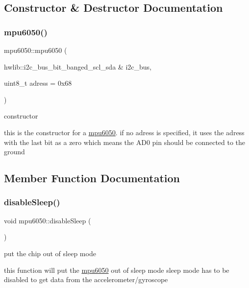 \subsection{Constructor \& Destructor Documentation}
\mbox{\label{classmpu6050_a1938b793c68db02885ef121b0718db54}} 
\subsubsection{\texorpdfstring{mpu6050()}{mpu6050()}}
{\footnotesize\ttfamily mpu6050\+::mpu6050 (\begin{DoxyParamCaption}\item[{hwlib\+::i2c\+\_\+bus\+\_\+bit\+\_\+banged\+\_\+scl\+\_\+sda \&}]{i2c\+\_\+bus,  }\item[{uint8\+\_\+t}]{adress = {\ttfamily 0x68} }\end{DoxyParamCaption})\hspace{0.3cm}{\ttfamily [inline]}}



constructor 

this is the constructor for a \hyperlink{classmpu6050}{mpu6050}. if no adress is specified, it uses the adress with the last bit as a zero which means the A\+D0 pin should be connected to the ground 

\subsection{Member Function Documentation}
\mbox{\label{classmpu6050_af945ffe99c421c67cd4e4134a37f99d2}} 
\subsubsection{\texorpdfstring{disable\+Sleep()}{disableSleep()}}
{\footnotesize\ttfamily void mpu6050\+::disable\+Sleep (\begin{DoxyParamCaption}{ }\end{DoxyParamCaption})\hspace{0.3cm}{\ttfamily [inline]}}



put the chip out of sleep mode 

this function will put the \hyperlink{classmpu6050}{mpu6050} out of sleep mode sleep mode has to be disabled to get data from the accelerometer/gyroscope \mbox{\label{classmpu6050_a766d1a6a4d9af1dc47a21ae91b1ee289}} 
